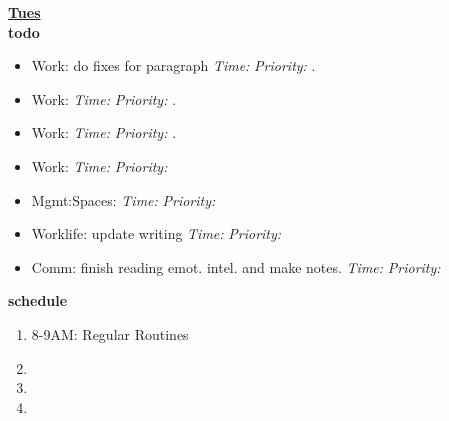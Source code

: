 \documentclass[11pt]{article}
\newcommand{\timeEst}[1]{\textit{Time:} \textit{#1}}
\newcommand{\priority}[1]{\textit{Priority:} \textit{#1}}
\newcommand{\deadline}[1]{#1}
\begin{document}
{            \textbf{\small \underline{Tues}} \\
            \textbf{\small todo} \\
            \begin{itemize}
              \tiny \item \tiny Work:  do fixes for paragraph                             \deadline{} \timeEst{} \priority{}. 
            \item \tiny Work:                                              \deadline{ }   \timeEst{}  \priority{}.
            \item \tiny Work:                                              \deadline{ }   \timeEst{}  \priority{}. 
            \item \tiny Work:                                              \deadline{} \timeEst{} \priority{} 
            \item \tiny Mgmt:Spaces:                                       \deadline{} \timeEst{} \priority{} 
            \item \tiny Worklife:   update writing                         \deadline{} \timeEst{} \priority{} 
            \item \tiny Comm:  finish reading emot. intel. and make notes.  \deadline{} \timeEst{} \priority{} 
            \end{itemize} 
            \textbf{\small schedule} \\
            \begin{enumerate}
              \tiny \item \tiny 8-9AM: Regular Routines 
            \item \tiny 
            \item \tiny 
            \item \tiny   
            \end{enumerate} 

}
\end{document}
